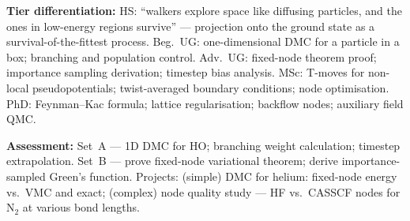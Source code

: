 \documentclass[11pt,a4paper]{article}
\begin{document}
\begin{tcolorbox}[modulebox, title={Module~II.1 --- Lecture L06: Quantum Monte Carlo II --- Diffusion QMC}]
\medskip\textbf{Tier differentiation:}
HS: ``walkers explore space like diffusing particles, and the ones in low-energy regions
survive'' --- projection onto the ground state as a survival-of-the-fittest process.
Beg.\ UG: one-dimensional DMC for a particle in a box; branching and population control.
Adv.\ UG: fixed-node theorem proof; importance sampling derivation; timestep bias analysis.
MSc: T-moves for non-local pseudopotentials; twist-averaged boundary conditions; node optimisation.
PhD: Feynman--Kac formula; lattice regularisation; backflow nodes; auxiliary field QMC.

\medskip\textbf{Assessment:}
Set~A --- 1D DMC for HO; branching weight calculation; timestep extrapolation.
Set~B --- prove fixed-node variational theorem; derive importance-sampled Green's function.
Projects: (simple) DMC for helium: fixed-node energy vs.\ VMC and exact;
(complex) node quality study --- HF vs.\ CASSCF nodes for N$_2$ at various bond lengths.
\end{tcolorbox}

\medskip
\end{document}
